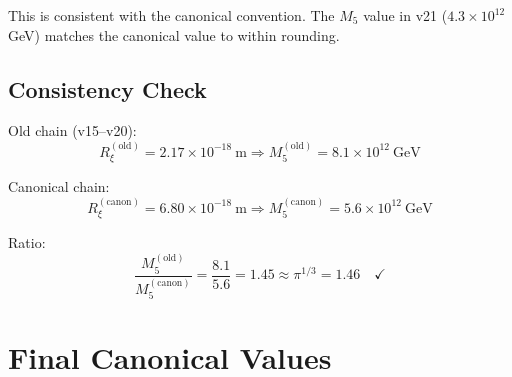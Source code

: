 \documentclass[11pt,a4paper]{article}
\newcommand{\Rxi}{R_\xi}
\newcommand{\Mfive}{M_5}
\begin{document}
This is consistent with the canonical convention. The $\Mfive$ value in v21
($4.3 \times 10^{12}$ GeV) matches the canonical value to within rounding.

\subsection{Consistency Check}

Old chain (v15--v20):
\begin{equation}
\Rxi^{\mathrm{(old)}} = 2.17 \times 10^{-18}~\mathrm{m} \Rightarrow
\Mfive^{\mathrm{(old)}} = 8.1 \times 10^{12}~\mathrm{GeV}
\label{eq:old-chain}
\end{equation}

Canonical chain:
\begin{equation}
\Rxi^{\mathrm{(canon)}} = 6.80 \times 10^{-18}~\mathrm{m} \Rightarrow
\Mfive^{\mathrm{(canon)}} = 5.6 \times 10^{12}~\mathrm{GeV}
\label{eq:canon-chain}
\end{equation}

Ratio:
\begin{equation}
\frac{\Mfive^{\mathrm{(old)}}}{\Mfive^{\mathrm{(canon)}}} = \frac{8.1}{5.6} = 1.45 \approx \pi^{1/3} = 1.46 \quad \checkmark
\label{eq:ratio-check}
\end{equation}

\section{Final Canonical Values}
\end{document}
